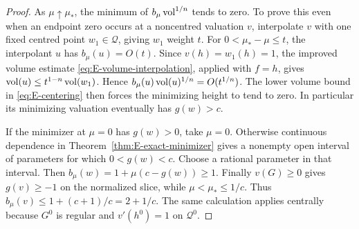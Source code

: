 \begin{proof}
As $\mu\uparrow\mu_*$, the minimum of
$b_\mu\operatorname{vol}^{1/n}$ tends to zero. To prove this even when an endpoint
zero occurs at a noncentred valuation $v$, interpolate $v$ with one
fixed centred point $w_1\in\mathcal Q$, giving $w_1$ weight $t$.
For $0<\mu_*-\mu\le t$, the interpolant $u$ has
$b_\mu(u)=O(t)$. Since $v(h)=w_1(h)=1$, the improved volume estimate
\eqref{eq:E-volume-interpolation}, applied with $f=h$, gives
$\operatorname{vol}(u)\le t^{1-n}\operatorname{vol}(w_1)$.
Hence $b_\mu(u)\operatorname{vol}(u)^{1/n}=O(t^{1/n})$.
The lower volume bound in \eqref{eq:E-centering} then forces the
minimizing height to tend to zero. In particular its minimizing
valuation eventually has $g(w)>c$.

If the minimizer at $\mu=0$ has $g(w)>0$, take $\mu=0$.
Otherwise continuous dependence in
Theorem~\ref{thm:E-exact-minimizer} gives a nonempty open interval
of parameters for which $0<g(w)<c$. Choose a rational parameter
in that interval. Then $b_\mu(w)=1+\mu(c-g(w))\ge1$.
Finally $v(G)\ge0$ gives $g(v)\ge-1$ on the normalized slice, while
$\mu<\mu_*\le1/c$. Thus
$b_\mu(v)\le1+(c+1)/c=2+1/c$.
The same calculation applies centrally because $G^0$ is regular and
$v'(h^0)=1$ on $\mathcal Q^0$.
\end{proof}
